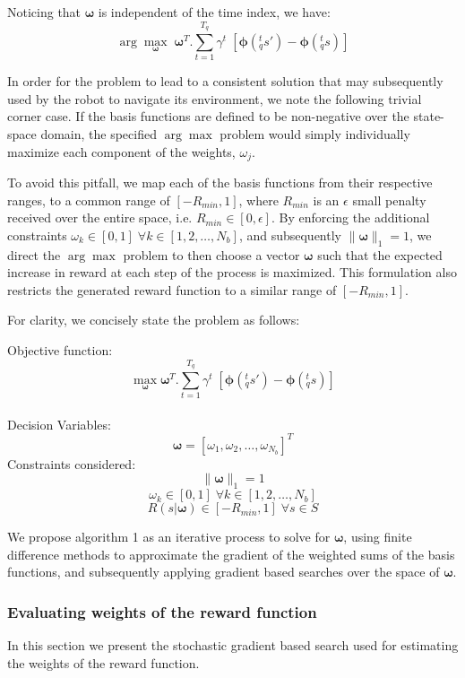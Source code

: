 Noticing that $\bm{\omega}$ is independent of the time index, we have: 
\begin{equation}
\arg\max_{\bm{\omega}} \; \bm{\omega}^T. \sum_{t=1}^{T_q} \gamma^t \; [ \bm{\phi}(_q^ts') - \bm{\phi}(_q^ts) ]
\end{equation}

In order for the problem to lead to a consistent solution that may subsequently used by the robot to navigate its environment, we note the following trivial corner case. If the basis functions are defined to be non-negative over the state-space domain, the specified $\arg\max$ problem would simply individually maximize each component of the weights, $\omega_j$. 

To avoid this pitfall, we map each of the basis functions from their respective ranges, to a common range of $[-R_{min},1]$, where $R_{min}$ is an $\epsilon$ small penalty received over the entire space, i.e. $R_{min} \in [0,\epsilon]$. By enforcing the additional constraints $\omega_k \in [0,1] \; \forall
k \in [1,2,\dots,N_b]$, and subsequently $\| \bm{\omega} \|_1 =1$, we direct the $\arg\max$ problem to then choose a vector $\bm{\omega}$ such that the expected increase in reward at each step of the process is maximized. This formulation also restricts the generated reward function to a similar range of $[-R_{min},1]$.

For clarity, we concisely state the problem as follows:

Objective function: $$\max_{\bm{\omega}} \bm{\omega}^T. \sum_{t=1}^{T_q} \gamma^t \; [ \bm{\phi}(_q^ts') - \bm{\phi}(_q^ts) ]$$\\
Decision Variables: $$ \bm{\omega} = [ \omega_1, \omega_2, \dots, \omega_{N_b}]^T$$
Constraints considered: $$\|\bm{\omega}\|_1=1$$
$$\omega_k \in [0,1] \; \forall k \in [1,2,\dots,N_b]$$
$$R(s|\bm{\omega}) \in [-R_{min},1] \; \forall s \in S$$

We propose algorithm 1 as an iterative process to solve for $\bm{\omega}$, using finite difference methods to approximate the gradient of the weighted sums of the basis functions, and subsequently applying gradient based searches over the space of $\bm{\omega}$.

\subsubsection{Evaluating weights of the reward function}
In this section we present the stochastic gradient based search used for estimating the weights of the reward function. 

